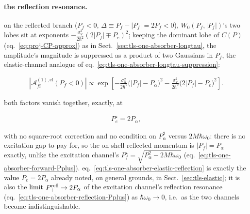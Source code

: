 \paragraph{the reflection resonance.} on the reflected branch ($P_f<0$, $\Delta\equiv P_f-|P_f|=2P_f<0$), $W_0(P_f,|P_f|)$'s two lobes sit at exponents $-\frac{\sigma_V^2}{2\hbar^2}(2|P_f|\mp P_e)^2$; keeping the dominant lobe of $C(P)$ (eq.~\eqref{eq:proj-CP-approx}) as in Sect.~\ref{sec:tls-one-absorber-longtau}, the amplitude's magnitude is suppressed as a product of two Gaussians in $P_f$, the elastic-channel analogue of eq.~\eqref{eq:tls-one-absorber-longtau-suppression}:
\begin{importantbox}
    \begin{align}
        \left|\mathcal A_{fi}^{(1),\text{el}}(P_f<0)\right| \propto \exp\left[-\frac{\sigma_\alpha^2}{2\hbar^2}\big(|P_f|-P_\alpha\big)^2 - \frac{\sigma_V^2}{2\hbar^2}\big(2|P_f|-P_e\big)^2\right].\label{eq:tls-one-absorber-elastic-suppression}
    \end{align}
\end{importantbox}
both factors vanish together, exactly, at
\begin{importantbox}
    \begin{align}
        P_e^\star = 2P_\alpha,\label{eq:tls-one-absorber-elastic-reflection}
    \end{align}
\end{importantbox}
with no square-root correction and no condition on $P_\alpha^2$ versus $2M\hbar\omega_0$: there is no excitation gap to pay for, so the on-shell reflected momentum is $|P_f|=P_\alpha$ exactly, unlike the excitation channel's $P_f^\star=\sqrt{P_\alpha^2-2M\hbar\omega_0}$ (eq.~\eqref{eq:tls-one-absorber-forward-Pplus}). eq.~\eqref{eq:tls-one-absorber-elastic-reflection} is exactly the value $P_e=2P_\alpha$ already noted, on general grounds, in Sect.~\ref{sec:tls-elastic}; it is also the limit $P_+^{\rm refl}\to2P_\alpha$ of the excitation channel's reflection resonance (eq.~\eqref{eq:tls-one-absorber-reflection-Pplus}) as $\hbar\omega_0\to0$, i.e.\ as the two channels become indistinguishable.

